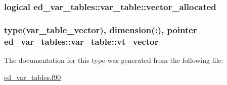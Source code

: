 \subsubsection[{vector\+\_\+allocated}]{\setlength{\rightskip}{0pt plus 5cm}logical ed\+\_\+var\+\_\+tables\+::var\+\_\+table\+::vector\+\_\+allocated}\label{structed__var__tables_1_1var__table_a41255913720040623a6bf9dd5b8267c5}
\hypertarget{structed__var__tables_1_1var__table_a3eacba058cb9fcc8bef162cbcfb0d106}{}
\subsubsection[{vt\+\_\+vector}]{\setlength{\rightskip}{0pt plus 5cm}type({\bf var\+\_\+table\+\_\+vector}), dimension(\+:), pointer ed\+\_\+var\+\_\+tables\+::var\+\_\+table\+::vt\+\_\+vector}\label{structed__var__tables_1_1var__table_a3eacba058cb9fcc8bef162cbcfb0d106}


The documentation for this type was generated from the following file\+:\begin{DoxyCompactItemize}
\item 
\hyperlink{ed__var__tables_8f90}{ed\+\_\+var\+\_\+tables.\+f90}\end{DoxyCompactItemize}
